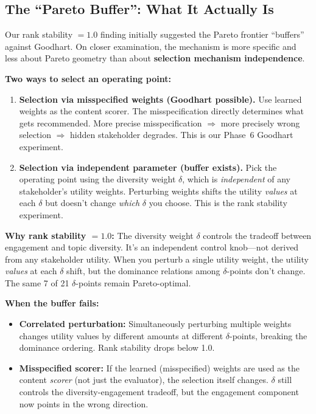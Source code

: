 \documentclass[11pt]{article}
\begin{document}
\subsection{The ``Pareto Buffer'': What It Actually Is}
\label{sec:pareto-buffer}

Our rank stability $= 1.0$ finding initially suggested the Pareto
frontier ``buffers'' against Goodhart. On closer examination, the
mechanism is more specific and less about Pareto geometry than about
\textbf{selection mechanism independence}.

\textbf{Two ways to select an operating point:}

\begin{enumerate}
  \item \textbf{Selection via misspecified weights (Goodhart possible).}
    Use learned weights as the content scorer. The misspecification
    directly determines what gets recommended. More precise
    misspecification $\Rightarrow$ more precisely wrong selection
    $\Rightarrow$ hidden stakeholder degrades. This is our Phase~6
    Goodhart experiment.

  \item \textbf{Selection via independent parameter (buffer exists).}
    Pick the operating point using the diversity weight $\delta$, which
    is \emph{independent} of any stakeholder's utility weights.
    Perturbing weights shifts the utility \emph{values} at each $\delta$
    but doesn't change \emph{which} $\delta$ you choose. This is the
    rank stability experiment.
\end{enumerate}

\textbf{Why rank stability $= 1.0$:} The diversity weight $\delta$
controls the tradeoff between engagement and topic diversity. It's an
independent control knob---not derived from any stakeholder utility. When
you perturb a single utility weight, the utility \emph{values} at each
$\delta$ shift, but the dominance relations among $\delta$-points don't
change. The same 7 of 21 $\delta$-points remain Pareto-optimal.

\textbf{When the buffer fails:}
\begin{itemize}
  \item \textbf{Correlated perturbation:} Simultaneously perturbing
    multiple weights changes utility values by different amounts at
    different $\delta$-points, breaking the dominance ordering. Rank
    stability drops below 1.0.
  \item \textbf{Misspecified scorer:} If the learned (misspecified)
    weights are used as the content \emph{scorer} (not just the
    evaluator), the selection itself changes. $\delta$ still controls
    the diversity-engagement tradeoff, but the engagement component
    now points in the wrong direction.
\end{itemize}
\end{document}
